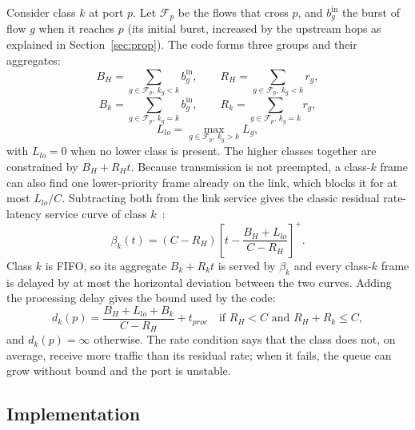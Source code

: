\documentclass[9pt,a4paper,twocolumn,twoside]{tau-class/tau}
\providecommand{\secref}[1]{Section~\ref{#1}}
\begin{document}
        Consider class $k$ at port $p$. Let $\mathcal{F}_p$ be the flows that cross $p$, and $b^{\mathrm{in}}_g$ the burst of flow $g$ when it reaches $p$ (its initial burst, increased by the upstream hops as explained in \secref{sec:prop}). The code forms three groups and their aggregates:
        \begin{equation}\label{eq:aggH}
            B_H = \textstyle\sum_{g \in \mathcal{F}_p,\, k_g < k} b^{\mathrm{in}}_g, \qquad
            R_H = \textstyle\sum_{g \in \mathcal{F}_p,\, k_g < k} r_g,
        \end{equation}
        \begin{equation}\label{eq:aggk}
            B_k = \textstyle\sum_{g \in \mathcal{F}_p,\, k_g = k} b^{\mathrm{in}}_g, \qquad
            R_k = \textstyle\sum_{g \in \mathcal{F}_p,\, k_g = k} r_g,
        \end{equation}
        \begin{equation}\label{eq:Llo}
            L_{lo} = \textstyle\max_{g \in \mathcal{F}_p,\, k_g > k} L_g,
        \end{equation}
        with $L_{lo} = 0$ when no lower class is present. The higher classes together are constrained by $B_H + R_H t$. Because transmission is not preempted, a class-$k$ frame can also find one lower-priority frame already on the link, which blocks it for at most $L_{lo}/C$. Subtracting both from the link service gives the classic residual rate-latency service curve of class $k$~\cite{leboudec2001nc,bouillard2018dnc}:
        \begin{equation}\label{eq:residual}
            \beta_k(t) = (C - R_H)\left[t - \frac{B_H + L_{lo}}{C - R_H}\right]^+ .
        \end{equation}
        Class $k$ is FIFO, so its aggregate $B_k + R_k t$ is served by $\beta_k$ and every class-$k$ frame is delayed by at most the horizontal deviation between the two curves. Adding the processing delay gives the bound used by the code:
        \begin{equation}\label{eq:hop}
            d_k(p) = \frac{B_H + L_{lo} + B_k}{C - R_H} + t_{proc}
            \quad \mbox{if } R_H < C \mbox{ and } R_H + R_k \le C,
        \end{equation}
        and $d_k(p) = \infty$ otherwise. The rate condition says that the class does not, on average, receive more traffic than its residual rate; when it fails, the queue can grow without bound and the port is unstable.

    \subsection{Implementation}
\end{document}

